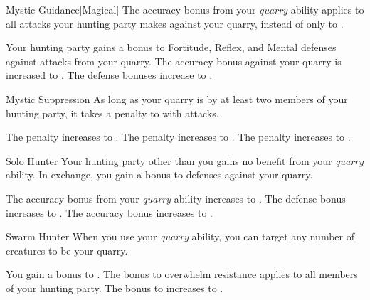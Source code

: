 {            \begin{freeability}{Mystic Guidance}[Magical]
                The accuracy bonus from your \textit{quarry} ability applies to all attacks your hunting party makes against your quarry, instead of only to .

                \rankline
                 Your hunting party gains a  bonus to Fortitude, Reflex, and Mental defenses against attacks from your quarry.
                 The accuracy bonus against your quarry is increased to .
                 The defense bonuses increase to .
            \end{freeability}

            \begin{freeability}{Mystic Suppression}
                As long as your quarry is  by at least two members of your hunting party, it takes a  penalty to  with  attacks.

                \rankline
                 The penalty increases to . 
                 The penalty increases to .
                 The penalty increases to .
            \end{freeability}

            \begin{freeability}{Solo Hunter}
                Your hunting party other than you gains no benefit from your \textit{quarry} ability.
                In exchange, you gain a  bonus to defenses against your quarry.

                \rankline
                 The accuracy bonus from your \textit{quarry} ability increases to .
                 The defense bonus increases to .
                 The accuracy bonus increases to .
            \end{freeability}

            \begin{freeability}{Swarm Hunter}
                When you use your \textit{quarry} ability, you can target any number of creatures to be your quarry.

                \rankline
                 You gain a  bonus to .
                 The bonus to overwhelm resistance applies to all members of your hunting party.
                 The bonus to  increases to .
            \end{freeability}

}
